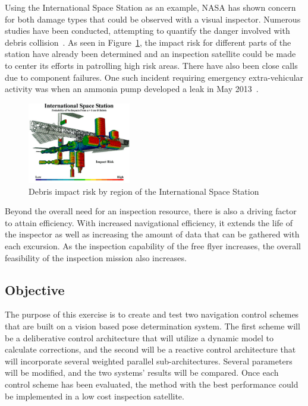 \documentclass[journal, 10pt]{IEEEtran}
\begin{document}
Using the International Space Station as an example, NASA has shown concern for both damage types that could be observed with a visual inspector.  Numerous studies have been conducted, attempting to quantify the danger involved with debris collision~\cite{Risk}.  As seen in Figure~\ref{ISS_risk}, the impact risk for different parts of the station have already been determined and an inspection satellite could be made to center its efforts in patrolling high risk areas.  There have also been close calls due to component failures.  One such incident requiring emergency extra-vehicular activity was when an ammonia pump developed a leak in May 2013~\cite{Ammonia}.

\begin{figure}[tb]
\begin{center}
\includegraphics[width=0.4\textwidth]{figures/ISS_impact_risk}
\caption{Debris impact risk by region of the International Space Station}
\label{ISS_risk}
\end{center}
\end{figure}

Beyond the overall need for an inspection resource, there is also a driving factor to attain efficiency.  With increased navigational efficiency, it extends the life of the inspector as well as increasing the amount of data that can be gathered with each excursion.  As the inspection capability of the free flyer increases, the overall feasibility of the inspection mission also increases.


\subsection{Objective}
The purpose of this exercise is to create and test two navigation control schemes that are built on a vision based pose determination system.  The first scheme will be a deliberative control architecture that will utilize a dynamic model to calculate corrections, and the second will be a reactive control architecture that will incorporate several weighted parallel sub-architectures. Several parameters will be modified, and the two systems' results will be compared. Once each control scheme has been evaluated, the method with the best performance could be implemented in a low cost inspection satellite.
\end{document}
